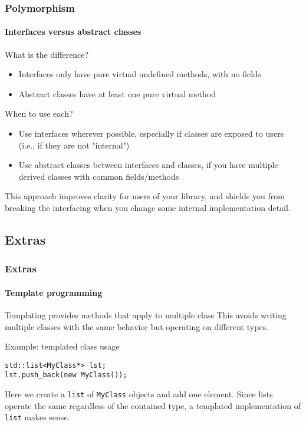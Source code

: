 \begin{frame}
\frametitle{Polymorphism}
\framesubtitle{Interfaces versus abstract classes}

\begin{block}{What is the difference?}
\begin{itemize}
\item Interfaces only have pure virtual undefined methods, with no fields
\item Abstract classes have at least one pure virtual method
\end{itemize}
\end{block}
\pause
\begin{block}{When to use each?}
\begin{itemize}
\item Use interfaces wherever possible, especially if classes are exposed to users (i.e., if they are not "internal")
\item Use abstract classes between interfaces and classes, if you have multiple derived classes with common fields/methods
\end{itemize}
This approach improves clarity for users of your library, and shields you from breaking the interfacing when you change some internal implementation detail.
\end{block}

\end{frame}

\subsection{Extras}

\begin{frame}[fragile]
\frametitle{Extras}
\framesubtitle{Template programming}

\begin{block}{Templating provides methods that apply to multiple class}
This avoids writing multiple classes with the same behavior but operating on different types.
\end{block}
\pause
\begin{block}{Example: templated class usage}
\vspace{-1em}
\begin{verbatim}
std::list<MyClass*> lst;
lst.push_back(new MyClass());
\end{verbatim}
Here we create a \texttt{list} of \texttt{MyClass} objects and add one element. Since lists operate the same regardless of the contained type, a templated implementation of \texttt{list} makes sense.
\end{block}

\end{frame}


